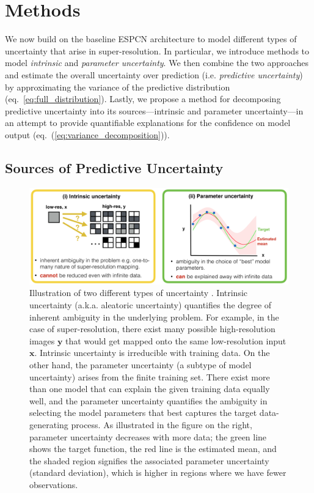\section{Methods} 
We now build on the baseline ESPCN architecture to model different types of uncertainty that arise in super-resolution. In particular, we introduce methods to model \textit{intrinsic} and \textit{parameter uncertainty}. We then combine the two approaches and estimate the overall uncertainty over prediction (i.e. \textit{predictive uncertainty}) by approximating the variance of the predictive distribution (eq.~\eqref{eq:full_distribution}). Lastly, we propose a method for decomposing predictive uncertainty into its sources---intrinsic and parameter uncertainty---in an attempt to provide quantifiable explanations for the confidence on model output (eq.~(\ref{eq:variance_decomposition})). 


\subsection{Sources of Predictive Uncertainty }
\begin{figure}[t]
	\includegraphics[width=0.95\linewidth]{chapter_3/figures/fig_intro.png}
	\centering	
	\caption{\footnotesize Illustration of two different types of uncertainty \cite{hora1996aleatory}. Intrinsic uncertainty \cite{wang1996intrinsic} (a.k.a. aleatoric uncertainty) quantifies the degree of inherent ambiguity in the underlying problem. For example, in the case of super-resolution, there exist many possible high-resolution images $\textbf{y}$ that would get mapped onto the same low-resolution input $\textbf{x}$. Intrinsic uncertainty is irreducible with training data. On the other hand, the parameter uncertainty \cite{draper1995assessment} (a subtype of model uncertainty) arises from the finite training set. There exist more than one model that can explain the given training data equally well, and the parameter uncertainty quantifies the ambiguity in selecting the model parameters that best captures the target data-generating process. As illustrated in the figure on the right, parameter uncertainty decreases with more data; the green line shows the target function, the red line is the estimated mean, and the shaded region signifies the associated parameter uncertainty (standard deviation), which is higher in regions where we have fewer observations.} 
	\label{fig:uncertainty_types}
\end{figure}

